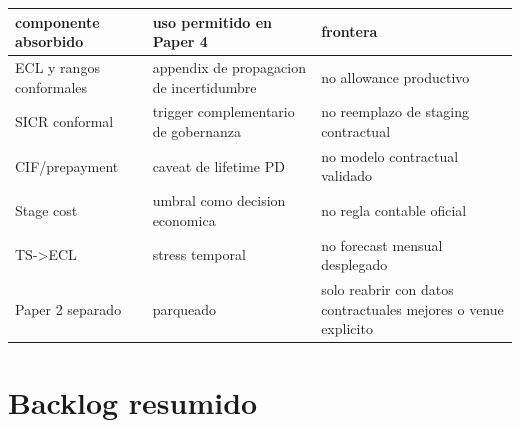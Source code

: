 \documentclass[
  spanish,
  11pt,
  letterpaper,
]{scrbook}
\newcounter{none} %
\theoremstyle{plain}
\theoremstyle{remark}
\begin{document}
{\def\LTcaptype{none} %
\begin{longtable}[]{@{}
  >{\raggedright\arraybackslash}p{}
  >{\raggedright\arraybackslash}p{}
  >{\raggedright\arraybackslash}p{}@{}}
\toprule\noalign{}
\begin{minipage}[b]{\linewidth}\raggedright
componente absorbido
\end{minipage} & \begin{minipage}[b]{\linewidth}\raggedright
uso permitido en Paper 4
\end{minipage} & \begin{minipage}[b]{\linewidth}\raggedright
frontera
\end{minipage} \\
\midrule\noalign{}
\endhead
\bottomrule\noalign{}
\endlastfoot
ECL y rangos conformales & appendix de propagacion de incertidumbre & no
allowance productivo \\
SICR conformal & trigger complementario de gobernanza & no reemplazo de
staging contractual \\
CIF/prepayment & caveat de lifetime PD & no modelo contractual
validado \\
Stage cost & umbral como decision economica & no regla contable
oficial \\
TS-\textgreater ECL & stress temporal & no forecast mensual
desplegado \\
Paper 2 separado & parqueado & solo reabrir con datos contractuales
mejores o venue explicito \\
\end{longtable}
}

\section{Backlog resumido}\label{backlog-resumido}
\end{document}
